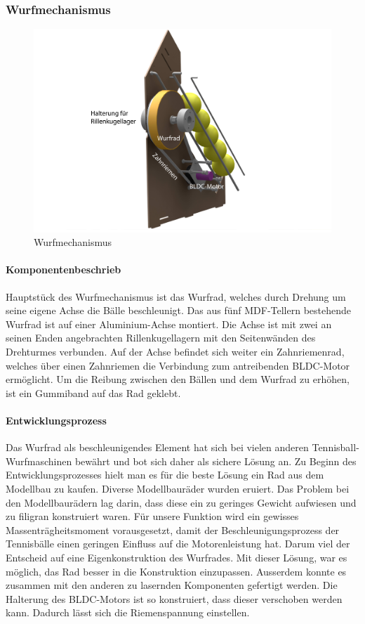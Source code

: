\subsubsection{Wurfmechanismus}
\begin{figure}[h!]
	\centering
	\includegraphics[width=\linewidth]{../../fig/Render-Wurfmechanismusx}
	\caption{Wurfmechanismus}
	\label{fig:Wurfmechanismus}
\end{figure}
\paragraph{Komponentenbeschrieb\\}
Hauptstück des Wurfmechanismus ist das Wurfrad, welches durch Drehung um seine eigene Achse die Bälle beschleunigt.
Das aus fünf MDF-Tellern bestehende Wurfrad ist auf einer  Aluminium-Achse montiert. Die Achse ist mit zwei an seinen Enden angebrachten Rillenkugellagern mit den Seitenwänden des Drehturmes verbunden. Auf der Achse befindet sich weiter ein Zahnriemenrad, welches über einen Zahnriemen die Verbindung zum antreibenden BLDC-Motor ermöglicht.
Um die Reibung zwischen den Bällen und dem Wurfrad zu erhöhen, ist ein Gummiband auf das Rad geklebt.

\paragraph{Entwicklungsprozess\\}
Das Wurfrad als beschleunigendes Element hat sich bei vielen anderen Tennisball-Wurfmaschinen bewährt und bot sich daher als sichere Lösung an.
Zu Beginn des Entwicklungsprozesses hielt man es für die beste Lösung ein Rad aus dem Modellbau zu kaufen. Diverse Modellbauräder wurden eruiert. Das Problem bei den Modellbaurädern lag darin, dass diese ein zu geringes Gewicht aufwiesen und zu filigran konstruiert waren. Für unsere Funktion wird ein gewisses Massenträgheitsmoment vorausgesetzt, damit der Beschleunigungsprozess der Tennisbälle einen geringen Einfluss auf die Motorenleistung hat. Darum viel der Entscheid auf eine Eigenkonstruktion des Wurfrades. Mit dieser Lösung, war es möglich, das Rad besser in die Konstruktion einzupassen. Ausserdem konnte es zusammen mit den anderen zu lasernden Komponenten gefertigt werden. Die Halterung des BLDC-Motors ist so konstruiert, dass dieser verschoben werden kann. Dadurch lässt sich die Riemenspannung einstellen.   